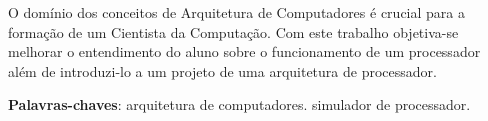 \documentclass[
	12pt,				%
	oneside,			%
	a4paper,			%
	english,			%
	french,				%
	spanish,			%
	brazil,				%
	]{abntex2}
\begin{document}
{%





\setlength{\absparsep}{18pt} %
\begin{resumo}
 O domínio dos conceitos de Arquitetura de Computadores é crucial para a
 formação de um Cientista da Computação. Com este trabalho objetiva-se melhorar
 o entendimento do aluno sobre o funcionamento de um processador além de
 introduzi-lo a um projeto de uma arquitetura de processador.

 \noindent
 \textbf{Palavras-chaves}: arquitetura de computadores. simulador de processador.
\end{resumo}


\listoftables*
\cleardoublepage


}
\end{document}
